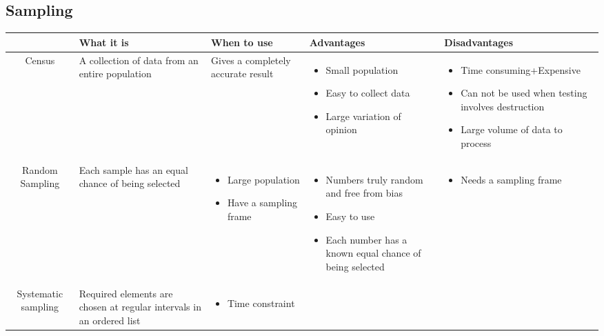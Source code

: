 \documentclass{article}[5pt]
\begin{document}
\setcounter{section}{2}
\setcounter{subsection}{1}
\subsection{Sampling}
\begin{tabularx}{\textwidth}{|c|X|X|X|X|}
\hline
&What it is&When to use&Advantages&Disadvantages\\
\hline
Census&A collection of data from an entire population&Gives a completely accurate result&
\begin{itemize}
\item Small population
\item Easy to collect data
\item Large variation of opinion
\end{itemize}&

\begin{itemize}
\item Time consuming+Expensive
\item Can not be used when testing involves destruction
\item Large volume of data to process
\end{itemize}\\
\hline


Random Sampling
&Each sample has an equal chance of being selected&

\begin{itemize}
\item Large population
\item Have a sampling frame
\end{itemize}&

\begin{itemize}
\item Numbers truly random and free from bias
\item Easy to use
\item Each number has a known equal chance of being selected
\end{itemize}&
\begin{itemize}
\item Needs a sampling frame
\end{itemize}\\
\hline


Systematic sampling
&Required elements are chosen at regular intervals in an ordered list&
\begin{itemize}
\item Time constraint
\end{itemize}&


\end{tabularx}
\end{document}
